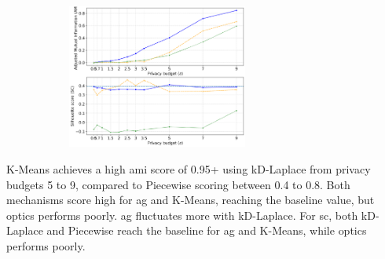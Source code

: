 \begin{figure}[H]
\begin{subfigure}{1\textwidth}
            \centering
            \includegraphics[width=0.65\textwidth]{Results/kd-laplace/piecewise/heart-dataset/ami-and-sc_2_dimensions.png}
      \end{subfigure}
      \label{fig:validation-heart-dataset_comparison_2d-laplace}
\end{figure}
K-Means achieves a high \gls{ami} score of 0.95+ using kD-Laplace from privacy budgets 5 to 9, compared to Piecewise scoring between 0.4 to 0.8.
Both mechanisms score high for \gls{ag} and K-Means, reaching the baseline value, but \gls{optics} performs poorly.
\gls{ag} fluctuates more with kD-Laplace. For \gls{sc}, both kD-Laplace and Piecewise reach the baseline for \gls{ag} and K-Means, while \gls{optics} performs poorly.
\newpage
